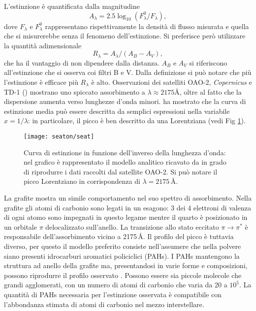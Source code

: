 L'estinzione è quantificata dalla magnitudine
\begin{equation}
A_{\lambda}=2.5\log_{10}(F_{\lambda}^{0}/F_{\lambda}),
\end{equation}
dove $F_{\lambda}$ e $F_{\lambda}^{0}$ rappresentano rispettivamente la densità di flusso misurata e quella che si misurerebbe senza il fenomeno dell'estinzione.
Si preferisce però utilizzare la quantità adimensionale
\begin{equation}
R_{\lambda}=A_{\lambda}/(A_{B}-A_{V}),
\end{equation}
che ha il vantaggio di non dipendere dalla distanza. $A_{B}$ e $A_{V}$ si riferiscono all'estinzione che si osserva coi filtri B e V. Dalla definizione si può notare che più l'estinzione è efficace più $R_{\lambda}$ è alto.
Osservazioni dei satelliti OAO-2, \textit{Copernicus} e TD-1 (\cite{OAO}) mostrano uno spiccato assorbimento a $\lambda\approx2175$\AA{}, oltre al fatto che la dispersione aumenta verso lunghezze d'onda minori.
\textcite{Seaton} ha mostrato che la curva di estinzione media può essere descritta da semplici espressioni nella variabile $x=1/\lambda$: in particolare, il picco è ben descritto da una Lorentziana (vedi Fig \ref{fig:seat}).

\begin{figure}
\centering
\texttt{[image: seaton/seat]}
\caption{Curva di estinzione in funzione dell'inverso della lunghezza d'onda: nel grafico è rappresentato il modello analitico ricavato da \textcite{Seaton} in grado di riprodurre i dati raccolti dal satellite OAO-2. Si può notare il picco Lorentziano in corrispondenza di $\lambda=2175$\,\AA{}.}
\label{fig:seat}
\end{figure}

La grafite mostra un simile comportamento nel suo spettro di assorbimento. Nella grafite gli atomi di carbonio sono legati in un esagono: 3 dei 4 elettroni di valenza di ogni atomo sono impegnati in questo legame mentre il quarto è posizionato in un orbitale $\pi$ delocalizzato sull'anello. La transizione allo stato eccitato $\pi\rightarrow\pi^{*}$ è responsabile dell'assorbimento vicino a 2175\,\AA{}. Il profilo del picco è tuttavia diverso, per questo il modello preferito consiste nell'assumere che nella polvere siano presenti idrocarburi aromatici policiclici (PAHs). I PAHs mantengono la struttura ad anello della grafite ma, presentandosi in varie forme e composizioni, possono riprodurre il profilo osservato \parencite{WD01a}. Possono essere sia piccole molecole che grandi agglomerati, con un numero di atomi di carbonio che varia da 20 a $10^{5}$. La quantità di PAHs necessaria per l'estinzione osservata è compatibile \parencite[p. 297]{WD01a} con l'abbondanza stimata di atomi di carbonio nel mezzo interstellare.

